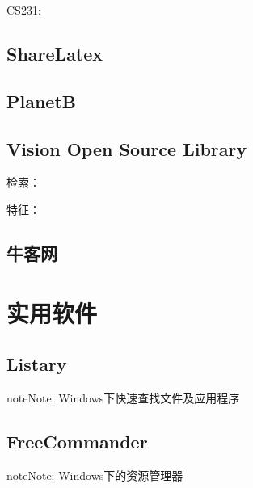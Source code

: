\documentclass[letterpaper,10pt,english]{sphinxmanual}
\begin{document}
CS231: 


\section{ShareLatex}
\label{\detokenize{link/index:sharelatex}}


\section{PlanetB}
\label{\detokenize{link/index:planetb}}


\section{Vision Open Source Library}
\label{\detokenize{link/index:vision-open-source-library}}
检索： 

特征： 


\section{牛客网}
\label{\detokenize{link/index:id2}}


\chapter{实用软件}
\label{\detokenize{softwares/index::doc}}\label{\detokenize{softwares/index:id1}}

\section{Listary}
\label{\detokenize{softwares/index:listary}}
\begin{sphinxadmonition}{note}{Note:}
Windows下快速查找文件及应用程序
\end{sphinxadmonition}



\section{FreeCommander}
\label{\detokenize{softwares/index:freecommander}}
\begin{sphinxadmonition}{note}{Note:}
Windows下的资源管理器
\end{sphinxadmonition}
\end{document}
